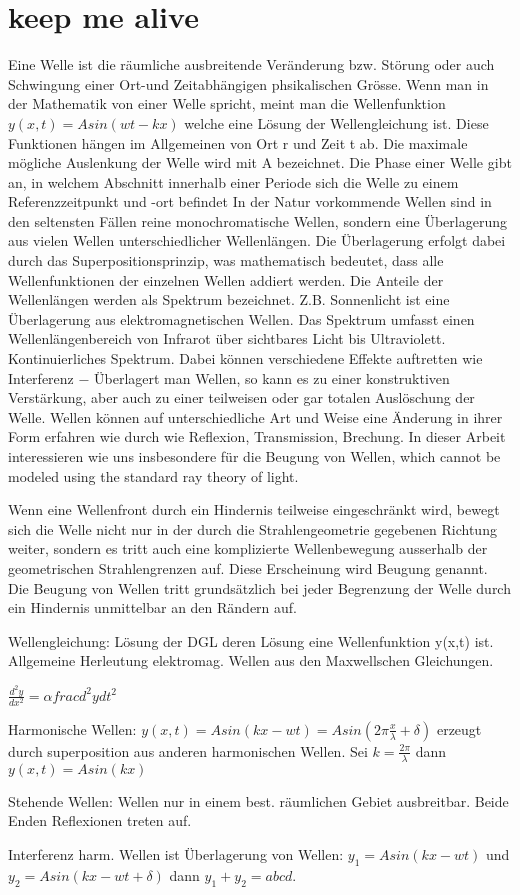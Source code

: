 \section{keep me alive}
Eine Welle ist die räumliche ausbreitende Veränderung bzw. Störung oder auch Schwingung einer Ort-und Zeitabhängigen phsikalischen Grösse. Wenn man in der Mathematik von einer Welle spricht, meint man die Wellenfunktion $y(x,t) = A sin(wt - kx)$ welche eine Lösung der Wellengleichung ist. Diese Funktionen hängen im Allgemeinen von Ort r und Zeit t ab.
Die maximale mögliche Auslenkung der Welle wird mit A bezeichnet. Die Phase einer Welle gibt an, in welchem Abschnitt innerhalb einer Periode sich die Welle zu einem Referenzzeitpunkt und -ort befindet
In der Natur vorkommende Wellen sind in den seltensten Fällen reine monochromatische Wellen, sondern eine Überlagerung aus vielen Wellen unterschiedlicher Wellenlängen. Die Überlagerung erfolgt dabei durch das Superpositionsprinzip, was mathematisch bedeutet, dass alle Wellenfunktionen der einzelnen Wellen addiert werden. Die Anteile der Wellenlängen werden als Spektrum bezeichnet. Z.B. Sonnenlicht ist eine Überlagerung aus elektromagnetischen Wellen. Das Spektrum umfasst einen Wellenlängenbereich von Infrarot über sichtbares Licht bis Ultraviolett. Kontinuierliches Spektrum. 
Dabei können verschiedene Effekte auftretten wie Interferenz − Überlagert man Wellen, so kann es zu einer konstruktiven Verstärkung, aber auch zu einer teilweisen oder gar totalen Auslöschung der Welle.
Wellen können auf unterschiedliche Art und Weise eine Änderung in ihrer Form erfahren wie durch wie Reflexion, Transmission, Brechung. In dieser Arbeit interessieren wie uns insbesondere für die Beugung von Wellen, which cannot be modeled using the standard ray theory of light.

Wenn eine Wellenfront durch ein Hindernis teilweise eingeschränkt wird, bewegt sich die Welle nicht nur in der durch die Strahlengeometrie gegebenen Richtung weiter, sondern es tritt auch eine komplizierte Wellenbewegung ausserhalb der geometrischen Strahlengrenzen auf. Diese Erscheinung wird Beugung genannt. Die Beugung von Wellen tritt grundsätzlich bei jeder Begrenzung der Welle durch ein Hindernis unmittelbar an den Rändern auf. 



Wellengleichung: Lösung der DGL deren Lösung eine Wellenfunktion y(x,t) ist. Allgemeine Herleutung elektromag. Wellen aus den Maxwellschen Gleichungen.

$\frac{d^2 y}{dx^2} = \alpha frac{d^2 y}{dt^2}$

Harmonische Wellen: $y(x,t) = A sin(kx - wt) = A sin(2\pi \frac{x}{\lambda} + \delta)$ erzeugt durch superposition aus anderen harmonischen Wellen. Sei $k = \frac{2 \pi}{\lambda}$ dann $y(x,t) = A sin(kx)$

Stehende Wellen: Wellen nur in einem best. räumlichen Gebiet ausbreitbar. Beide Enden Reflexionen treten auf.

Interferenz harm. Wellen ist Überlagerung von Wellen: $y_1 = A sin(kx - wt)$ und $y_2 = A sin(kx - wt + \delta)$ dann $y_1 + y_2 = abcd$.
